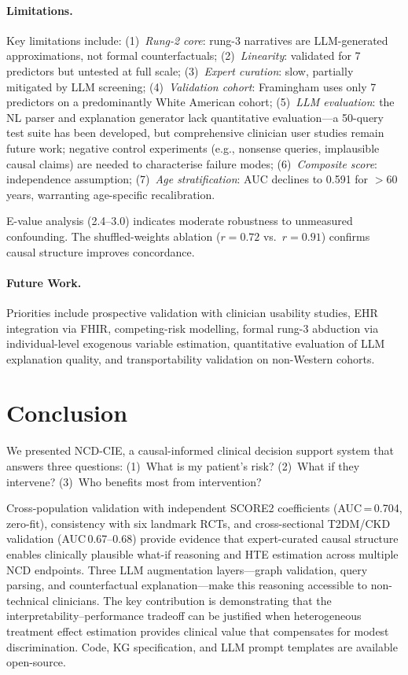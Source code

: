 \documentclass[runningheads]{llncs}
\begin{document}
\paragraph{Limitations.}
Key limitations include:
(1)~\emph{Rung-2 core}: rung-3 narratives are LLM-generated
approximations, not formal counterfactuals;
(2)~\emph{Linearity}: validated for 7 predictors but untested at
full scale;
(3)~\emph{Expert curation}: slow, partially mitigated by LLM screening;
(4)~\emph{Validation cohort}: Framingham uses only 7 predictors on a
predominantly White American cohort;
(5)~\emph{LLM evaluation}: the NL parser and explanation generator
lack quantitative evaluation---a 50-query test suite has been developed,
but comprehensive clinician user studies remain future work;
negative control experiments (e.g., nonsense queries, implausible
causal claims) are needed to characterise failure modes;
(6)~\emph{Composite score}: independence assumption;
(7)~\emph{Age stratification}: AUC declines to 0.591 for $>$60 years,
warranting age-specific recalibration.

E-value analysis (2.4--3.0) indicates moderate robustness to
unmeasured confounding.
The shuffled-weights ablation ($r = 0.72$ vs.\ $r = 0.91$)
confirms causal structure improves concordance.

\paragraph{Future Work.}
Priorities include prospective validation with clinician usability
studies, EHR integration via FHIR, competing-risk modelling,
formal rung-3 abduction via individual-level exogenous variable
estimation, quantitative evaluation of LLM explanation quality,
and transportability validation on non-Western cohorts.

\section{Conclusion}\label{sec:conclusion}

We presented NCD-CIE, a causal-informed clinical decision support
system that answers three questions:
(1)~What is my patient's risk?
(2)~What if they intervene?
(3)~Who benefits most from intervention?

Cross-population validation with independent SCORE2 coefficients
(AUC\,=\,0.704, zero-fit), consistency with six landmark RCTs,
and cross-sectional T2DM/CKD validation (AUC\,0.67--0.68)
provide evidence that expert-curated causal structure enables
clinically plausible what-if reasoning and HTE estimation across
multiple NCD endpoints.
Three LLM augmentation layers---graph validation, query parsing,
and counterfactual explanation---make this reasoning accessible
to non-technical clinicians.
The key contribution is demonstrating that the interpretability--performance
tradeoff can be justified when heterogeneous treatment effect
estimation provides clinical value that compensates for modest
discrimination.
Code, KG specification, and LLM prompt templates are available
open-source.
\end{document}

